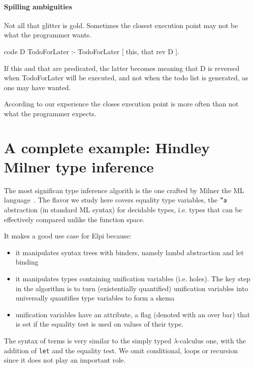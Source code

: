 \documentclass[a4paper, 11pt]{book}
\begin{document}
\paragraph{Spilling ambiguities}

Not all that glitter is gold. Sometimes the closest execution
point may not be what the programmer wants.

\begin{elpicode}
  code D TodoForLater  :-
    TodoForLater [ this, that {rev D} ].
\end{elpicode}

If this and that are predicated, the latter becomes
 meaning that
D is reversed when TodoForLater will be executed, and
not when the todo list is generated, as one may have wanted.

According to our experience the closes execution point
is more often than not what the programmer expects.

\section{A complete example: Hindley Milner type inference}

The most significan type inference algorith is the one crafted by
Milner the ML language~\cite{MILNER1978348}. The flavor we 
study here covers equality type variables, the \texttt{''a} abstraction
(in standard ML syntax) for decidable types, i.e. types that can be
effectively compared unlike the function space.

It makes a good use case for Elpi because:
\begin{itemize}
  \item it manipulates syntax trees with binders, namely lambd abstraction
    and let binding
  \item it manipulates types containing unification variables (i.e. holes).
    The key step in the algorithm is to turn (existentially quantified)
    unification variables into universally quantifies type variables to
    form a skema
  \item unification variables have an attribute, a flag (denoted with
    an over bar) that is set if the equality test is used on values
    of their type.
\end{itemize}

The syntax of terms is very similar to the simply typed $\lambda$-calculus
one, with the addition of \texttt{let} and the equality test. We omit
conditional, loops or recursion since it does not play an important role.
\end{document}
